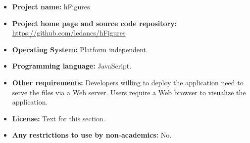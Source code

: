 \documentclass[twocolumn]{bmcart}%
\begin{document}
\begin{itemize}
\item \textbf{Project name:} hFigures
\item \textbf{Project home page and source code repository:} \url{https://github.com/ledancs/hFigures}
\item \textbf{Operating System:} Platform independent.
\item \textbf{Programming language:} JavaScript.
\item \textbf{Other requirements:} Developers willing to deploy the application need to serve the files via a Web server. Users require a Web browser to visualize the application.
\item \textbf{License:} Text for this section.
\item \textbf{Any restrictions to use by non-academics:} No.
\end{itemize}

\end{document}

